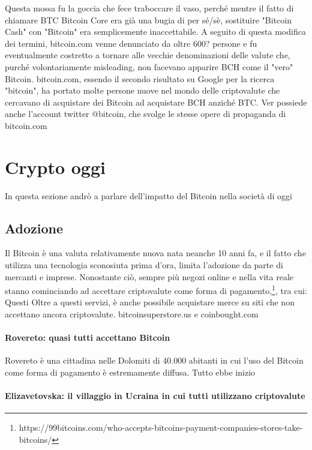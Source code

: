 \documentclass {article}
\begin{document}
{Questa mossa fu la goccia che fece traboccare il vaso, perché mentre il fatto di chiamare BTC Bitcoin Core era già una bugia di per sé/sè, sostituire "Bitcoin Cash" con "Bitcoin" era semplicemente inaccettabile.
A seguito di questa modifica dei termini, bitcoin.com venne denunciato da oltre 600? persone e fu eventualmente costretto a tornare alle vecchie denominazioni delle valute che, purché volontariamente misleading, non facevano apparire BCH come il "vero" Bitcoin.
bitcoin.com, essendo il secondo risultato su Google per la ricerca "bitcoin", ha portato molte persone nuove nel mondo delle criptovalute che cercavano di acquistare dei Bitcoin ad acquistare BCH anziché BTC.
Ver possiede anche l'account twitter @bitcoin, che svolge le stesse opere di propaganda di bitcoin.com


\section {Crypto oggi}


In questa sezione andrò a parlare dell'impatto del Bitcoin nella società di oggi


\subsection {Adozione}


Il Bitcoin è una valuta relativamente nuova nata neanche 10 anni fa, e il fatto che utilizza una tecnologia sconosiuta prima d'ora, limita l'adozione da parte di mercanti e imprese.
Nonostante ciò, sempre più negozi online e nella vita reale stanno cominciando ad accettare criptovalute come forma di pagamento,\footnote{https://99bitcoins.com/who-accepts-bitcoins-payment-companies-stores-take-bitcoins/}, tra cui:
Questi 
Oltre a questi servizi, è anche possibile acquistare merce su siti che non accettano ancora criptovalute. bitcoinsuperstore.us e coinbought.com


\paragraph {Rovereto: quasi tutti accettano Bitcoin}


Rovereto è una cittadina nelle Dolomiti di 40.000 abitanti in cui l'uso del Bitcoin come forma di pagamento è estremamente diffusa.
Tutto ebbe inizio


\paragraph {Elizavetovska: il villaggio in Ucraina in cui tutti utilizzano criptovalute}


}
\end{document}
